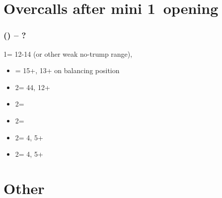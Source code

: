 \section{\texorpdfstring{Overcalls after mini 1\ntx\ opening}{overcallsAfterMini1nt}}\label{sec:overcallsAfterMini1nt}

\subsubsection*{(\alrts{1\nt}) -- ?}
1\nt = 12-14 (or other weak no-trump range), \bal
\begin{itemize}
    \item \dbl = 15+, 13+ on balancing position
    \item 2\clubs = 44\major, 12+
    \item 2\diams = \trsf{\hearts}
    \item 2\hearts = \trsf{\spades}
    \item 2\spades = 4\spades, 5+\minor
    \item 2\nt = 4\hearts, 5+\minor
\end{itemize}

\section{\texorpdfstring{Other}{otherBidsAndRules}}\label{sec:otherBidsAndRules}



